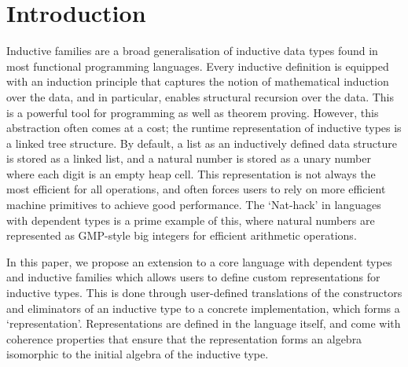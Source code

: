 \section{Introduction}\label{sec:intro}

Inductive families are a broad generalisation of inductive data types found in
most functional programming languages. Every inductive definition is equipped
with an induction principle that captures the notion of mathematical induction
over the data, and in particular, enables structural recursion over the data.
This is a powerful tool for programming as well as theorem proving. However,
this abstraction often comes at a cost; the runtime representation of inductive
types is a linked tree structure. By default, a list as an inductively defined
data structure is stored as a linked list, and a natural number is stored as a
unary number where each digit is an empty heap cell. This representation is not
always the most efficient for all operations, and often forces users to rely on
more efficient machine primitives to achieve good performance. The `Nat-hack' in
languages with dependent types is a prime example of this, where natural numbers
are represented as GMP-style big integers for efficient arithmetic operations.

In this paper, we propose an extension to a core language with dependent types
and inductive families which allows users to define custom representations for
inductive types. This is done through user-defined translations of the
constructors and eliminators of an inductive type to a concrete implementation,
which forms a `representation'. Representations are defined in the language
itself, and come with coherence properties that ensure that the representation
forms an algebra isomorphic to the initial algebra of the inductive type.




